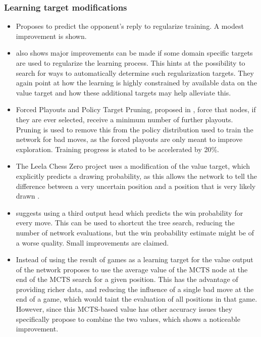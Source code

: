 \documentclass[12pt,onecolumn,oneside,titlepage]{article}
\begin{document}
\subsubsection{Learning target modifications}

\begin{itemize}
 \item \cite{wu2019accelerating} Proposes to predict the opponent's reply to regularize training. A modest improvement is shown.
 \item \cite{wu2019accelerating} also shows major improvements can be made if some domain specific targets are used to regularize the learning process. This hints at the possibility to search for ways to automatically determine such regularization targets.
 They again point at how the learning is highly constrained by available data on the value target and how these additional targets may help alleviate this.
 \item Forced Playouts and Policy Target Pruning, proposed in \cite{wu2019accelerating}, force that nodes, if they are ever selected, receive a minimum number of further playouts. Pruning is used to remove this from the policy distribution used to train the network for bad moves,
 as the forced playouts are only meant to improve exploration. Training progress is stated to be accelerated by 20\%.
 \item The Leela Chess Zero project uses a modification of the value target, which explicitly predicts a drawing probability, as this allows the network to tell the difference between a very uncertain position and a position that is very likely drawn \cite{leela0wdl}.
 \item \cite{anonymous2020threehead} suggests using a third output head which predicts the win probability for every move. This can be used to shortcut the tree search, reducing the number of network evaluations, but the win probability estimate might be of a worse quality.
  Small improvements are claimed.
 \item Instead of using the result of games as a learning target for the value output of the network \cite{oracledevs6} proposes to use the average value of the MCTS node at the end of the MCTS search for a given position. This has the advantage of providing richer data,
 and reducing the influence of a single bad move at the end of a game, which would taint the evaluation of all positions in that game. However, since this MCTS-based value has other accuracy issues they specifically propose to combine the two values, which shows a noticeable improvement.
\end{itemize}
\end{document}
